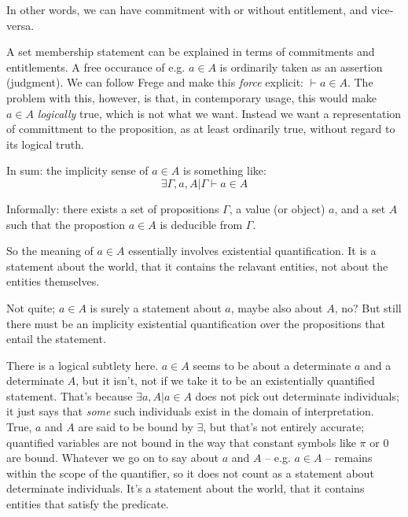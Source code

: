 In other words, we can have commitment with or without entitlement,
and vice-versa.

A set membership statement can be explained in terms of commitments
and entitlements.  A free occurance of e.g. \(a\in A\) is ordinarily
taken as an assertion (judgment).  We can follow Frege and make this
\textit{force} explicit: \(\vdash a\in A\).  The problem with this,
however, is that, in contemporary usage, this would make \(a\in A\)
\textit{logically} true, which is not what we want.  Instead we want a
representation of committment to the proposition, as at least
ordinarily true, without regard to its logical truth.

In sum:  the implicity sense of \(a\in A\) is something like: 
\[\exists \Gamma, a, A | \Gamma\vdash a\in A\]

Informally: there exists a set of propositions \(\Gamma\), a value (or
object) \(a\), and a set \(A\) such that the propostion \(a\in A\) is
deducible from \(\Gamma\).

So the meaning of \(a\in A\) essentially involves existential
quantification.  It is a statement about the world, that it contains
the relavant entities, not about the entities themselves.

\begin{remark}
  Not quite; \(a\in A\) is surely a statement about \(a\), maybe also
  about \(A\), no?  But still there must be an implicity existential
  quantification over the propositions that entail the statement.
\end{remark}

There is a logical subtlety here.  \(a\in A\) seems to be about a
determinate \(a\) and a determinate \(A\), but it isn't, not if we
take it to be an existentially quantified statement.  That's because
\(\exists a, A | a\in A\) does not pick out determinate individuals;
it just says that \textit{some} such individuals exist in the domain
of interpretation.  True, \(a\) and \(A\) are said to be bound by
\(\exists\), but that's not entirely accurate; quantified variables
are not bound in the way that constant symbols like \(\pi\) or \(0\)
are bound.  Whatever we go on to say about \(a\) and \(A\) --
e.g. \(a\in A\) -- remains within the scope of the quantifier, so it
does not count as a statement about determinate individuals.  It's a
statement about the world, that it contains entities that satisfy the
predicate.

